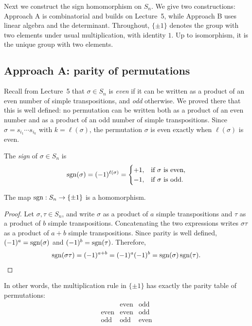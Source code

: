 \documentclass[reqno,11pt]{amsart}
\begin{document}
Next we construct the sign homomorphism on $S_n$. We give two
constructions: Approach A is combinatorial and builds on Lecture~5, while
Approach B uses linear algebra and the determinant. Throughout, $\{\pm1\}$
denotes the group with two elements under usual multiplication, with
identity $1$. Up to isomorphism, it is the unique group with two elements.

\subsection*{Approach A: parity of permutations}

Recall from Lecture~5 that $\sigma\in S_n$ is \emph{even} if it can be
written as a product of an even number of simple transpositions, and
\emph{odd} otherwise. We proved there that this is well defined: no
permutation can be written both as a product of an even number and as a
product of an odd number of simple transpositions. Since
$\sigma=s_{i_1}\cdots s_{i_k}$ with $k=\ell(\sigma)$, the permutation
$\sigma$ is even exactly when $\ell(\sigma)$ is even.

\begin{define}[Sign]
The \emph{sign} of $\sigma\in S_n$ is
\begin{equation}
  \operatorname{sgn}(\sigma)=(-1)^{\ell(\sigma)}=
  \begin{cases}
    +1,&\text{if $\sigma$ is even},\\
    -1,&\text{if $\sigma$ is odd}.
  \end{cases}
\end{equation}
\end{define}

\begin{proposition}\label{prop:sgn-hom}
The map $\operatorname{sgn}:S_n\to\{\pm1\}$ is a homomorphism.
\end{proposition}

\begin{proof}
Let $\sigma,\tau\in S_n$, and write $\sigma$ as a product of $a$ simple
transpositions and $\tau$ as a product of $b$ simple transpositions.
Concatenating the two expressions writes $\sigma\tau$ as a product of $a+b$
simple transpositions. Since parity is well defined,
$(-1)^a=\operatorname{sgn}(\sigma)$ and $(-1)^b=\operatorname{sgn}(\tau)$. Therefore,
\[
  \operatorname{sgn}(\sigma\tau)=(-1)^{a+b}=(-1)^a(-1)^b=\operatorname{sgn}(\sigma)\operatorname{sgn}(\tau).
\]
\end{proof}

In other words, the multiplication rule in $\{\pm1\}$ has exactly the
parity table of permutations:
\[
\begin{array}{c|cc}
 &\text{even}&\text{odd}\\ \hline
\text{even}&\text{even}&\text{odd}\\
\text{odd}&\text{odd}&\text{even}
\end{array}
\]
\end{document}
